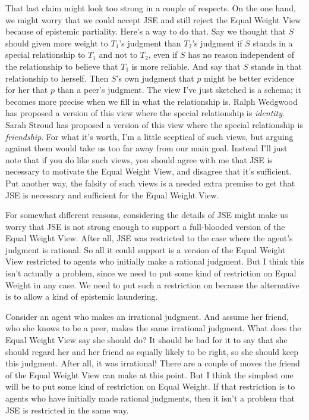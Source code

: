 That last claim might look too strong in a couple of respects. On the one hand, we might worry that we could accept JSE and still reject the Equal Weight View because of epistemic partiality. Here's a way to do that. Say we thought that \(S\) should given more weight to \(T_1\)'s judgment than \(T_2\)'s judgment if \(S\) stands in a special relationship to \(T_1\) and not to \(T_2\), even if \(S\) has no reason independent of the relationship to believe that \(T_1\) is more reliable. And say that \(S\) stands in that relationship to herself. Then \(S\)'s own judgment that \(p\) might be better evidence for her that \(p\) than a peer's judgment. The view I've just sketched is a schema; it becomes more precise when we fill in what the relationship is. Ralph Wedgwood has proposed a version of this view where the special relationship is \textit{identity}. Sarah Stroud has proposed a version of this view where the special relationship is \textit{friendship}. For what it's worth, I'm a little sceptical of such views, but arguing against them would take us too far away from our main goal. Instead I'll just note that if you do like such views, you should agree with me that JSE is necessary to motivate the Equal Weight View, and disagree that it's sufficient. Put another way, the falsity of such views is a needed extra premise to get that JSE is necessary and sufficient for the Equal Weight View.

For somewhat different reasons, considering the details of JSE might make us worry that JSE is not strong enough to support a full-blooded version of the Equal Weight View. After all, JSE was restricted to the case where the agent's judgment is rational. So all it could support is a version of the Equal Weight View restricted to agents who initially make a rational judgment. But I think this isn't actually a problem, since we need to put some kind of restriction on Equal Weight in any case. We need to put such a restriction on because the alternative is to allow a kind of epistemic laundering.

Consider an agent who makes an irrational judgment. And assume her friend, who she knows to be a peer, makes the same irrational judgment. What does the Equal Weight View say she should do? It should be bad for it to say that she should regard her and her friend as equally likely to be right, so she should keep this judgment. After all, it was irrational! There are a couple of moves the friend of the Equal Weight View can make at this point. But I think the simplest one will be to put some kind of restriction on Equal Weight. If that restriction is to agents who have initially made rational judgments, then it isn't a problem that JSE is restricted in the same way. 

